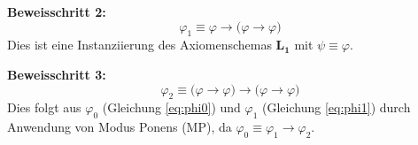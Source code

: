 \begin{math-stroke}
\textbf{Beweisschritt 2:}
\begin{equation}\label{eq:phi1}
\varphi_1 \equiv \varphi \rightarrow \bigl(\varphi \rightarrow \varphi\bigr)
\end{equation}
Dies ist eine Instanziierung des Axiomenschemas $\mathbf{L_1}$ mit $\psi \equiv \varphi$.

\textbf{Beweisschritt 3:}
\begin{equation}\label{eq:phi2}
\varphi_2 \equiv \bigl(\varphi \rightarrow \varphi\bigr) \rightarrow \bigl(\varphi \rightarrow \varphi\bigr)
\end{equation}
Dies folgt aus $\varphi_0$ (Gleichung \ref{eq:phi0}) und $\varphi_1$ (Gleichung \ref{eq:phi1}) durch Anwendung von Modus Ponens ($\text{MP}$), da $\varphi_0 \equiv \varphi_1 \rightarrow \varphi_2$.
\end{math-stroke}


